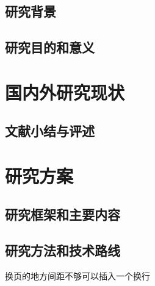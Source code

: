 \documentclass[draftformat,mathCMR]{HUSTthesis}
\begin{document}
\section{研究背景}
\section{研究目的和意义}



\chapter{国内外研究现状}



\section{文献小结与评述}


\chapter{研究方案}
\section{研究框架和主要内容}



\section{研究方法和技术路线}


换页的地方间距不够可以插入一个换行
\end{document}

